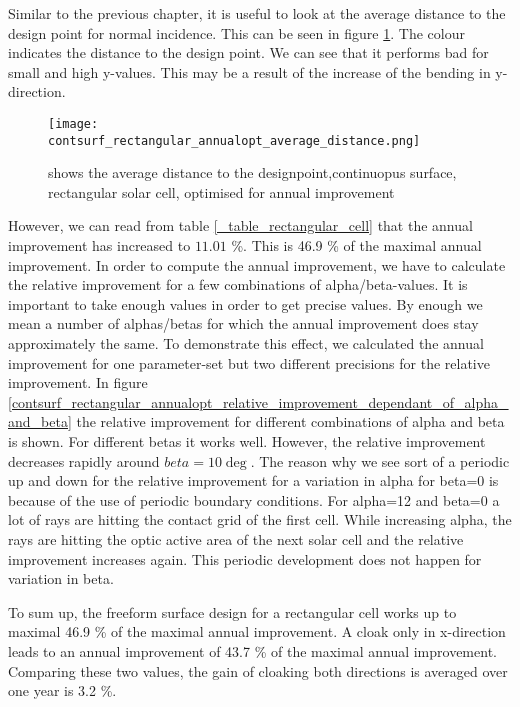 Similar to the previous chapter, it is useful to look at the average distance to the design point for normal incidence. This can be seen in figure \ref{contsurf_rectangular_annualopt_average_distance}. The colour indicates the distance to the design point. We can see that it performs bad for small and high y-values. This may be a result of the increase of the bending in y-direction. 

\begin{figure}[h]
\centering
\texttt{[image: contsurf\_rectangular\_annualopt\_average\_distance.png]}
\caption{shows the average distance to the designpoint,continuopus surface, rectangular solar cell, optimised for annual improvement \label{contsurf_rectangular_annualopt_average_distance}}
\end{figure}

However, we can read from table \ref{_table_rectangular_cell} that the annual improvement has increased to $11.01$ \%. This is 46.9 \% of the maximal annual improvement. In order to compute the annual improvement, we have to calculate the relative improvement for a few combinations of alpha/beta-values. It is important to take enough values in order to get precise values. By enough we mean a number of alphas/betas for which the annual improvement does stay approximately the same. To demonstrate this effect, we calculated the annual improvement for one parameter-set but two different precisions for the relative improvement. 
In figure \ref{contsurf_rectangular_annualopt_relative_improvement_dependant_of_alpha_and_beta} the relative improvement for different combinations of alpha and beta is shown. For different betas it works well. However, the relative improvement decreases rapidly around $beta=10 \deg$. The reason why we see sort of a periodic up and down for the relative improvement for a variation in alpha for beta=0 is because of the use of periodic boundary conditions. For alpha=12 and beta=0 a lot of rays are hitting the contact grid of the first cell. While increasing alpha, the rays are hitting the optic active area of the next solar cell and the relative improvement increases again. This periodic development does not happen for variation in beta. 

To sum up, the freeform surface design for a rectangular cell works up to maximal 46.9 \% of the maximal annual improvement. A cloak only in x-direction leads to an annual improvement of 43.7 \% of the maximal annual improvement. Comparing these two values, the gain of cloaking both directions is averaged over one year is 3.2 \%.  


